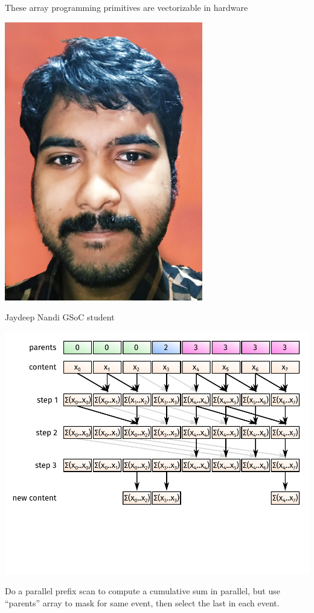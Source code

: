 \documentclass[aspectratio=169]{beamer}
\begin{document}
\begin{frame}{These array programming primitives are vectorizable in hardware}
\vspace{0.5 cm}
\hfill \begin{minipage}{0.2\linewidth}
\begin{center}
\includegraphics[height=2.5 cm]{jaydeep.jpg}

\small Jaydeep Nandi GSoC student
\end{center}
\end{minipage}

\vspace{-3.55 cm}
\includegraphics[width=0.75\linewidth]{hillis-steele-3.pdf}

\vspace{-2 cm} Do a parallel prefix scan to compute a cumulative sum in parallel, but use ``parents'' array to mask for same event, then select the last in each event. \vspace{2 cm}
\end{frame}
\end{document}
